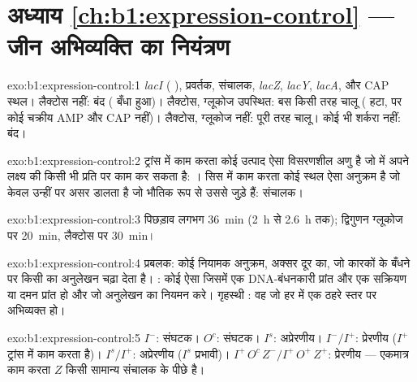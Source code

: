 \section*{अध्याय \ref{ch:b1:expression-control} --- जीन अभिव्यक्ति का नियंत्रण}

\begin{solution}{exo:b1:expression-control:1}
\emph{lacI} ( ), प्रवर्तक, संचालक, \emph{lacZ},
\emph{lacY}, \emph{lacA}, और CAP स्थल। लैक्टोस नहीं: बंद (
बँधा हुआ)। लैक्टोस, ग्लूकोज उपस्थित: बस किसी तरह चालू ( हटा, पर
कोई चक्रीय AMP और CAP नहीं)। लैक्टोस, ग्लूकोज नहीं: पूरी तरह चालू। कोई भी
शर्करा नहीं: बंद।
\end{solution}

\begin{solution}{exo:b1:expression-control:2}
ट्रांस में काम करता कोई उत्पाद ऐसा विसरणशील अणु है जो  में अपने
लक्ष्य की किसी भी प्रति पर काम कर सकता है: । सिस में काम करता कोई
स्थल ऐसा  अनुक्रम है जो केवल उन्हीं  पर असर डालता है जो भौतिक रूप
से उससे जुड़े हैं: संचालक।
\end{solution}

\begin{solution}{exo:b1:expression-control:3}
पिछड़ाव लगभग \qty{36}{min} (\qty{2}{h} से \qty{2.6}{h} तक); द्विगुणन
ग्लूकोज पर \qty{20}{min}, लैक्टोस पर \qty{30}{min}।
\end{solution}

\begin{solution}{exo:b1:expression-control:4}
प्रबलक: कोई नियामक अनुक्रम, अक्सर दूर का, जो कारकों के बँधने पर किसी 
का अनुलेखन चढ़ा देता है। : कोई ऐसा  जिसमें एक
DNA-बंधनकारी प्रांत और एक सक्रियण या दमन प्रांत हो और जो
अनुलेखन का नियमन करे। गृहस्थी : वह जो हर
 में एक ठहरे स्तर पर अभिव्यक्त हो।
\end{solution}

\begin{solution}{exo:b1:expression-control:5}
$I^-$: संघटक। $O^c$: संघटक। $I^s$: अप्रेरणीय।
$I^-/I^+$: प्रेरणीय ($I^+$  ट्रांस में काम करता है)। $I^s/I^+$:
अप्रेरणीय ($I^s$ प्रभावी)। $I^+\,O^c\,Z^- / I^+\,O^+\,Z^+$: प्रेरणीय
--- एकमात्र काम करता $Z$ किसी सामान्य संचालक के पीछे है।
\end{solution}

